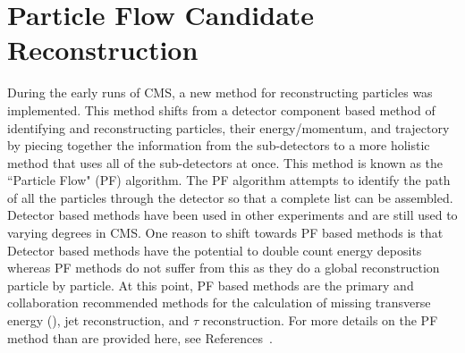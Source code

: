 	
	
	
	\section{Particle Flow Candidate Reconstruction}
	\label{sec:pf_algorithm}
	
	During the early runs of CMS, a new method for reconstructing particles was implemented. This method shifts from a detector component based method of identifying and reconstructing particles, their energy/momentum, and trajectory by piecing together the information from the sub-detectors to a more holistic method that uses all of the sub-detectors at once. This method is known as the ``Particle Flow" (PF) algorithm. The PF algorithm attempts to identify the path of all the particles through the detector so that a complete list can be assembled.\\
	
	Detector based methods have been used in other experiments and are still used to varying degrees in CMS. One reason to shift towards PF based methods is that Detector based methods have the potential to double count energy deposits whereas PF methods do not suffer from this as they do a global reconstruction particle by particle. At this point, PF based methods are the primary and collaboration recommended methods for the calculation of missing transverse energy (\met), jet reconstruction, and 
$\tau$ reconstruction. For more details on the PF method than are provided here, see References~\cite{pfReco,pfComm}.\\


